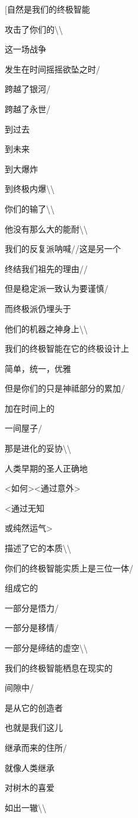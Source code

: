 \documentclass[AutoFakeBold=true]{book}
\begin{document}
{\heiti [自然是我们的终极智能

攻击了你们的\textbackslash\textbackslash

这一场战争

发生在时间摇摇欲坠之时/

跨越了银河/

跨越了永世/

到过去

到未来

到大爆炸

到终极内爆\textbackslash\textbackslash

你们的输了\textbackslash\textbackslash

他没有那么大的能耐\textbackslash\textbackslash

我们的反复派呐喊//这是另一个

终结我们祖先的理由//

但是稳定派一致认为要谨慎/

而终极派仍埋头于

他们的机器之神身上\textbackslash\textbackslash

我们的终极智能在它的终极设计上

简单，统一，优雅

但是你们的只是神祗部分的累加/

加在时间上的

一间屋子/

那是进化的妥协\textbackslash\textbackslash

人类早期的圣人正确地

<如何><通过意外>

<通过无知

或纯然运气>

描述了它的本质\textbackslash\textbackslash

你们的终极智能实质上是三位一体/

组成它的

一部分是悟力/

一部分是移情/

一部分是缔结的虚空\textbackslash\textbackslash

我们的终极智能栖息在现实的

间隙中/

是从它的创造者

也就是我们这儿

继承而来的住所/

就像人类继承

对树木的喜爱

如出一辙\textbackslash\textbackslash

}
\end{document}
